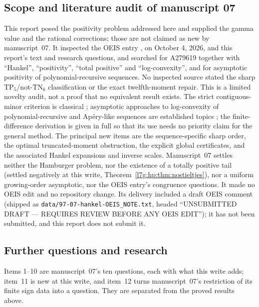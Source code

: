 \documentclass[11pt,letterpaper]{article}
\newcommand{\file}[1]{\nolinkurl{#1}}
\theoremstyle{remark}\newtheorem{remark}[theorem]{Remark}
\newcommand{\TP}{\mathrm{TP}}\newcommand{\TN}{\mathrm{TN}}
\newcounter{l7gtrsavedeq}
\begin{document}
\subsection{Scope and literature audit of manuscript 07}\label{l7g:hp:sec:audit}
This report posed the positivity problem addressed here and supplied the
gamma value and the rational corrections; those are not claimed as new by
manuscript~07. It inspected the OEIS entry \cite{l7g:oeis279619}, on October 4,
2026, and this report's text and research questions, and
searched for A279619 together with ``Hankel'', ``positivity'', ``total
positive'' and ``log-convexity'', and for asymptotic positivity of
polynomial-recursive sequences. No inspected source stated the sharp
$\TP_5$/not-$\TN_6$ classification or the exact twelfth-moment repair.
This is a limited novelty audit, not a proof that no equivalent result
exists. The strict contiguous-minor criterion is classical
\cite{l7g:hp:fjs}; asymptotic approaches to log-convexity of
polynomial-recursive and Ap\'ery-like sequences are established topics
\cite{l7g:hp:houzhang,l7g:hp:maopei}; the finite-difference derivation is
given in full so that its use needs no priority claim for the general
method. The principal new items are the sequence-specific sharp order, the
optimal truncated-moment obstruction, the explicit global certificates,
and the associated Hankel expansions and inverse scales. Manuscript~07
settles neither the Hamburger problem, nor the existence of a totally
positive tail (settled negatively at this write,
Theorem~\ref{l7g:hp:thm:nostieltjes}), nor a uniform growing-order
asymptotic, nor the OEIS entry's congruence questions. It made no OEIS edit
and no repository change. Its delivery included a draft OEIS comment
(shipped as \file{data/97-07-hankel-OEIS_NOTE.txt}, headed ``UNSUBMITTED
DRAFT --- REQUIRES REVIEW BEFORE ANY OEIS EDIT''); it has not been
submitted, and this report does not submit it.

\subsection{Further questions and research}\label{l7g:hp:sec:further}
Items 1--10 are manuscript~07's ten questions, each with what this write
adds; item~11 is new at this write, and item~12 turns manuscript~07's
restriction of its finite sign data into a question. They are separated
from the proved results above.
\end{document}

